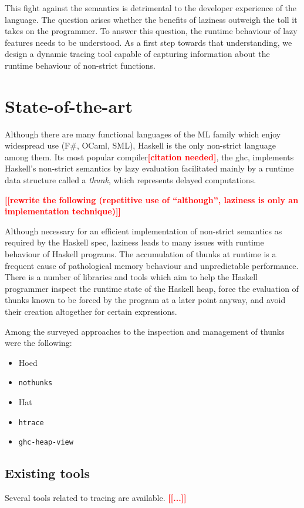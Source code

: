 \documentclass[thesis=B,english]{FITthesis}[2019/12/23]
\newcommand{\todo}[1]{\textcolor{red}{\textbf{[[#1]]}}}
\newcommand{\citationNeeded}{\textcolor{red}{\textbf{[citation needed]}}}
\newcommand{\hackage}[1]{\texttt{#1}}
\begin{document}
This fight against the semantics is detrimental to the developer experience of
the language. The question arises whether the benefits of laziness outweigh the
toll it takes on the programmer. To answer this question, the runtime behaviour
of lazy features needs to be understood. As a first step towards that
understanding, we design a dynamic tracing tool capable of capturing
information about the runtime behaviour of non-strict functions.


\chapter{State-of-the-art} \label{sec:state-of-the-art}
Although there are many functional languages of the ML family which enjoy
widespread use (F\#, OCaml, SML), Haskell is the only non-strict language among
them. Its most popular compiler\citationNeeded, the \acrfull{ghc}, implements
Haskell's non-strict semantics by lazy evaluation facilitated mainly by a
runtime data structure called a \textit{thunk}, which represents delayed
computations.

\todo{rewrite the following (repetitive use of ``although'', laziness is only
an implementation technique)}

Although necessary for an efficient implementation of non-strict semantics as
required by the Haskell spec\cite{haskell2010}, laziness leads to many issues with
runtime behaviour of Haskell programs. The accumulation of thunks at runtime is
a frequent cause of pathological memory behaviour and unpredictable
performance. There is a number of libraries and tools which aim to help the
Haskell programmer inspect the runtime state of the Haskell heap, force the
evaluation of thunks known to be forced by the program at a later point anyway,
and avoid their creation altogether for certain expressions.

Among the surveyed approaches to the inspection and management of thunks were
the following:
\begin{itemize}
	\item Hoed
	\item \hackage{nothunks}
	\item Hat
	\item \hackage{htrace}
	\item \hackage{ghc-heap-view}
\end{itemize}

\section{Existing tools} \label{sec:existing-tools}
Several tools related to tracing are available.
\todo{...}
\end{document}
